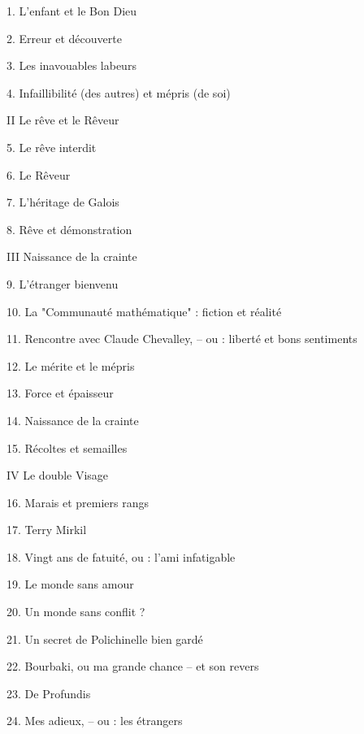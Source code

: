 \documentclass[11pt,a4paper]{article}
\begin{document}
1. L'enfant et le Bon Dieu

2. Erreur et découverte

3. Les inavouables labeurs

4. Infaillibilité (des autres) et mépris (de soi)

II Le rêve et le Rêveur

5. Le rêve interdit

6. Le Rêveur

7. L'héritage de Galois

8. Rêve et démonstration

III Naissance de la crainte

9. L'étranger bienvenu

10. La "Communauté mathématique" : fiction et réalité

11. Rencontre avec Claude Chevalley, -- ou : liberté et bons sentiments

12. Le mérite et le mépris

13. Force et épaisseur

14. Naissance de la crainte

15. Récoltes et semailles

IV Le double Visage

16. Marais et premiers rangs

17. Terry Mirkil

18. Vingt ans de fatuité, ou : l'ami infatigable

19. Le monde sans amour

20. Un monde sans conflit ?

21. Un secret de Polichinelle bien gardé

22. Bourbaki, ou ma grande chance -- et son revers

23. De Profundis

24. Mes adieux, -- ou : les étrangers


\end{document}
